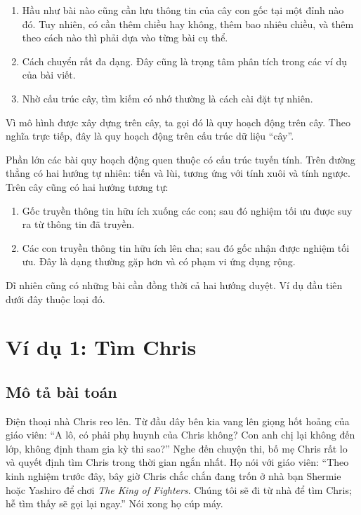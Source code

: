\documentclass[11pt]{article}
\begin{document}
\begin{enumerate}
  \item {} Hầu như bài nào cũng cần lưu thông tin của
  cây con gốc tại một đỉnh nào đó. Tuy nhiên, có cần thêm chiều hay không,
  thêm bao nhiêu chiều, và thêm theo cách nào thì phải dựa vào từng bài cụ
  thể.
  \item {} Cách chuyển rất đa dạng. Đây cũng là trọng
  tâm phân tích trong các ví dụ của bài viết.
  \item {} Nhờ cấu trúc cây, tìm kiếm có nhớ thường là
  cách cài đặt tự nhiên.
\end{enumerate}

Vì mô hình được xây dựng trên cây, ta gọi đó là quy hoạch động trên cây. Theo
nghĩa trực tiếp, đây là quy hoạch động trên cấu trúc dữ liệu ``cây''.

Phần lớn các bài quy hoạch động quen thuộc có cấu trúc tuyến tính. Trên đường
thẳng có hai hướng tự nhiên: tiến và lùi, tương ứng với tính xuôi và tính
ngược. Trên cây cũng có hai hướng tương tự:

\begin{enumerate}
  \item {} Gốc truyền thông tin hữu ích xuống các con;
  sau đó nghiệm tối ưu được suy ra từ thông tin đã truyền.
  \item {} Các con truyền thông tin hữu ích lên cha; sau
  đó gốc nhận được nghiệm tối ưu. Đây là dạng thường gặp hơn và có phạm vi
  ứng dụng rộng.
\end{enumerate}

Dĩ nhiên cũng có những bài cần đồng thời cả hai hướng duyệt. Ví dụ đầu tiên
dưới đây thuộc loại đó.

\section{Ví dụ 1: Tìm Chris}

\subsection{Mô tả bài toán}

Điện thoại nhà Chris reo lên. Từ đầu dây bên kia vang lên giọng hốt hoảng của
giáo viên: ``A lô, có phải phụ huynh của Chris không? Con anh chị lại không
đến lớp, không định tham gia kỳ thi sao?'' Nghe đến chuyện thi, bố mẹ Chris
rất lo và quyết định tìm Chris trong thời gian ngắn nhất. Họ nói với giáo
viên: ``Theo kinh nghiệm trước đây, bây giờ Chris chắc chắn đang trốn ở nhà
bạn Shermie hoặc Yashiro để chơi \emph{The King of Fighters}. Chúng tôi sẽ đi
từ nhà để tìm Chris; hễ tìm thấy sẽ gọi lại ngay.'' Nói xong họ cúp máy.
\end{document}
